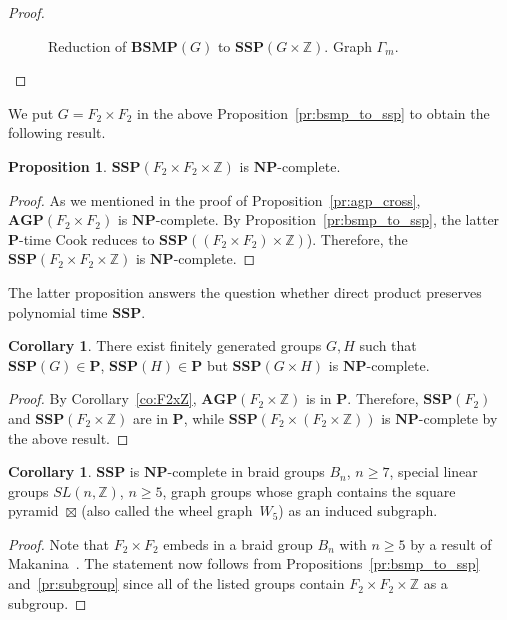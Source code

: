 \documentclass[10pt]{amsart}
\newcommand{\an}{\noindent\color{red} Andrey: }{}
\newcommand{\li}{\noindent\color{blue} Liza: }{}
\theoremstyle{definition}
\newtheorem{proposition}[theorem]{Proposition}
\newtheorem{corollary}[theorem]{Corollary}
\def\P{{\mathbf{P}}}
\def\NP{{\mathbf{NP}}}
\def\SSP{{\mathbf{SSP}}}
\def\BSMP{{\mathbf{BSMP}}}
\def\AGP{{\mathbf{AGP}}}
\begin{document}
\begin{proof}
\begin{figure}[h]
 \caption{Reduction of $\BSMP(G)$ to $\SSP(G\times \mathbb Z)$. Graph $\Gamma_m$.} \label{fi:bsmp_to_ssp}
\end{figure}
\end{proof}

We put $G=F_2\times F_2$ in the above Proposition~\ref{pr:bsmp_to_ssp} to obtain the following result.
\begin{proposition}\label{pr:ssp_cross}
$\SSP(F_2\times F_2\times \mathbb Z)$ is $\NP$-complete.
\end{proposition}
\begin{proof}
As we mentioned in the proof of Proposition~\ref{pr:agp_cross}, $\AGP(F_2\times F_2)$ is $\NP$-complete. By Proposition~\ref{pr:bsmp_to_ssp}, the latter $\P$-time Cook reduces to $\SSP((F_2\times F_2)\times\mathbb Z)$). Therefore, the $\SSP(F_2\times F_2\times \mathbb Z)$ is $\NP$-complete.
\end{proof}

The latter proposition answers the question whether direct product preserves polynomial time $\SSP$.

\begin{corollary}\label{cor:NP_complete_ssp_cross}
There exist finitely generated groups $G,H$ such that $\SSP(G)\in\P$, $\SSP(H)\in\P$ but $\SSP(G\times H)$ is $\NP$-complete.
\end{corollary}
\begin{proof}
By Corollary~\ref{co:F2xZ}, $\AGP(F_2\times\mathbb Z)$ is in $\P$. Therefore, $\SSP(F_2)$ and $\SSP(F_2\times\mathbb Z)$ are in $\P$, while
$\SSP(F_2\times (F_2\times \mathbb Z))$ is $\NP$-complete by the above result.
\end{proof}

\begin{corollary}
$\SSP$ is $\NP$-complete in braid groups $B_n$, $n\ge 7$, special linear groups $SL(n,\mathbb Z)$, $n\ge 5$, graph groups whose graph contains the square pyramid~$\boxtimes$ (also called the wheel graph~$W_5$) as an induced subgraph.
\end{corollary}
\begin{proof}
Note that $F_2\times F_2$ embeds in a braid group $B_n$ with $n\ge 5$ by a result of Makanina~\cite{Makanina}. The statement now follows from Propositions~\ref{pr:bsmp_to_ssp} and~\ref{pr:subgroup} since all of the listed groups contain $F_2\times F_2\times \mathbb Z$ as a subgroup.
\end{proof}
\end{document}
